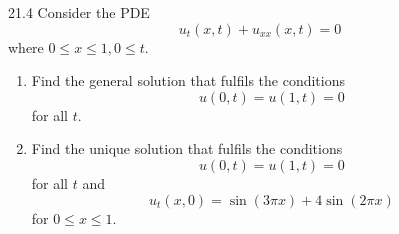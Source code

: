 \begin{problem}{21.4}
  Consider the PDE
  \begin{equation*}
    u_{t}(x,t) + u_{x x}(x,t) = 0
  \end{equation*}
  where $0\leq x \leq 1, 0 \leq t$.

  \begin{enumerate}[label=\alph*)]
    \item Find the general solution that fulfils the conditions
      \begin{equation*}
        u(0,t) = u(1,t) = 0
      \end{equation*}
      for all $t$.
    \item Find the unique solution that fulfils the conditions
      \begin{equation*}
        u(0,t) = u(1,t) = 0
      \end{equation*}
      for all $t$ and
      \begin{equation*}
        u_t(x,0) = \sin(3\pi x) + 4 \sin (2\pi x)
      \end{equation*}
      for $0 \leq x \leq 1$.
  \end{enumerate}
\end{problem}

